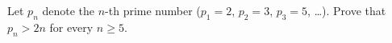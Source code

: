 Let $p_n$ denote the $n$-th prime number ($p_1=2$, $p_2=3$, $p_3=5$, \dots). Prove that $p_n>2n$ for every $n\ge5$.
